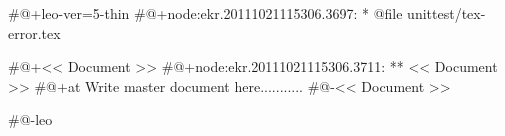 #@+leo-ver=5-thin
#@+node:ekr.20111021115306.3697: * @file unittest/tex-error.tex

#@+<< Document >>
#@+node:ekr.20111021115306.3711: ** << Document >>
#@+at Write master document here...........
#@-<< Document >>

#@-leo
